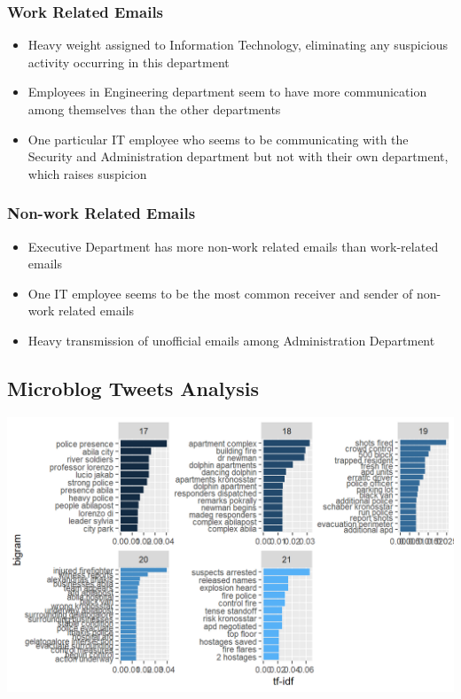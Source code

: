 \documentclass{acm_proc_article-sp}
\providecommand{\tightlist}{%
  \setlength{\itemsep}{0pt}\setlength{\parskip}{0pt}}
\begin{document}
\hypertarget{work-related-emails}{%
\subsubsection{Work Related Emails}\label{work-related-emails}}

\begin{itemize}
\tightlist
\item
  Heavy weight assigned to Information Technology, eliminating any
  suspicious activity occurring in this department
\item
  Employees in Engineering department seem to have more communication
  among themselves than the other departments
\item
  One particular IT employee who seems to be communicating with the
  Security and Administration department but not with their own
  department, which raises suspicion
\end{itemize}

\hypertarget{non-work-related-emails}{%
\subsubsection{Non-work Related Emails}\label{non-work-related-emails}}

\begin{itemize}
\tightlist
\item
  Executive Department has more non-work related emails than
  work-related emails
\item
  One IT employee seems to be the most common receiver and sender of
  non-work related emails
\item
  Heavy transmission of unofficial emails among Administration
  Department
\end{itemize}

\hypertarget{microblog-tweets-analysis}{%
\subsection{Microblog Tweets Analysis}\label{microblog-tweets-analysis}}

\includegraphics{img/image08.png}
\end{document}
